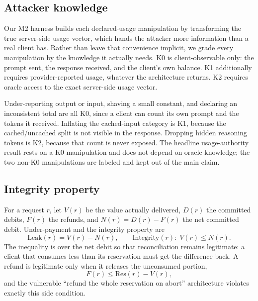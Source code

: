 \documentclass[manuscript,review,anonymous]{acmart}
\begin{document}
\subsection{Attacker knowledge}
Our M2 harness builds each declared-usage manipulation by transforming the true
server-side usage vector, which hands the attacker more information than a real client
has. Rather than leave that convenience implicit, we grade every manipulation by the
knowledge it actually needs. K0 is client-observable only: the prompt sent, the response
received, and the client's own balance. K1 additionally requires provider-reported usage,
whatever the architecture returns. K2 requires oracle access to the exact server-side
usage vector.

Under-reporting output or input, shaving a small constant, and declaring an inconsistent
total are all K0, since a client can count its own prompt and the tokens it received.
Inflating the cached-input category is K1, because the cached/uncached split is not
visible in the response. Dropping hidden reasoning tokens is K2, because that count is
never exposed. The headline usage-authority result rests on a K0 manipulation and does not
depend on oracle knowledge; the two non-K0 manipulations are labeled and kept out of the
main claim.

\subsection{Integrity property}
For a request $r$, let $V(r)$ be the value actually delivered, $D(r)$ the committed
debits, $F(r)$ the refunds, and $N(r) = D(r) - F(r)$ the net committed debit.
Under-payment and the integrity property are
\begin{equation}
\mathrm{Leak}(r) = V(r) - N(r), \qquad
\mathrm{Integrity}(r):\; V(r) \le N(r).
\label{eq:integrity}
\end{equation}
The inequality is over the net debit so that reconciliation remains legitimate: a client
that consumes less than its reservation must get the difference back. A refund is
legitimate only when it releases the unconsumed portion,
\begin{equation}
F(r) \le \mathrm{Res}(r) - V(r),
\label{eq:refund}
\end{equation}
and the vulnerable ``refund the whole reservation on abort'' architecture violates
exactly this side condition.
\end{document}
